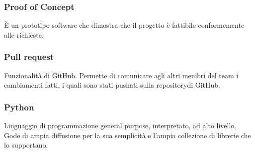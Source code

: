 \subsubsection*{Proof of Concept}
È un prototipo software che dimostra che il progetto è fattibile conformemente alle richieste.

\subsubsection*{Pull request}
Funzionalità di GitHub. Permette di comunicare agli altri membri del team i cambiamenti fatti, i  quali sono stati pushati sulla repository\glosp di GitHub.

\subsubsection*{Python}
Linguaggio di programmazione general purpose, interpretato, ad alto livello. Gode di ampia diffusione per la sua semplicità e l'ampia collezione di librerie che lo supportano.


